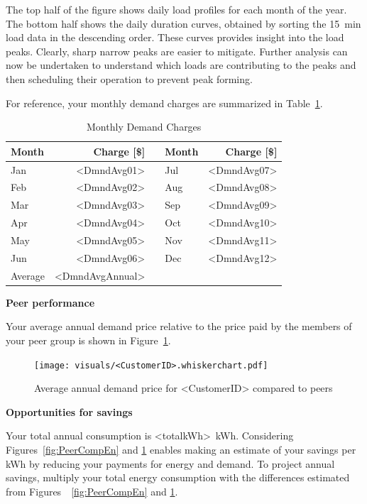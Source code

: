 \documentclass[11pt]{article}
\begin{document}
The top half of the figure shows daily load profiles for each month of the year.
The bottom half shows the daily duration curves, obtained by sorting the 15~min load data in the descending order.
These curves provides insight into  the load peaks.
Clearly, sharp narrow peaks are easier to mitigate.
Further analysis can now be undertaken to understand which loads are contributing to the peaks and then scheduling their operation to prevent peak forming.

\vfill\eject %

For reference, your monthly demand charges are summarized in Table~\ref{tab:demand}.
\begin{table}[th!]
  \centering
  \caption{Monthly Demand Charges}
  \vspace{1.5ex}
  \label{tab:demand}
  \begin{tabular}{p{0.75in}rp{0.2in}p{0.75in}r}
    Month & Charge [\$] & & Month & Charge [\$] \\
    \midrule
    Jan & <DmndAvg01> & & Jul & <DmndAvg07> \\
    Feb & <DmndAvg02> & & Aug & <DmndAvg08> \\
    Mar & <DmndAvg03> & & Sep & <DmndAvg09> \\
    Apr & <DmndAvg04> & & Oct & <DmndAvg10> \\
    May & <DmndAvg05> & & Nov & <DmndAvg11> \\
    Jun & <DmndAvg06> & & Dec & <DmndAvg12> \\
    \midrule
    Average & <DmndAvgAnnual>
  \end{tabular}
\end{table}

\vspace{3ex}
\textbf{\Large Peer performance}
\vspace{1ex}

Your average annual demand price relative to the price paid by the members of your peer group is shown in Figure~\ref{fig:PeerCompDmnd}.

\begin{figure}[!h]
\centering
\texttt{[image: visuals/<CustomerID>.whiskerchart.pdf]}
\caption{Average annual demand price for <CustomerID> compared to peers}
\label{fig:PeerCompDmnd}
\end{figure}

\vspace{3ex}
\textbf{\Large Opportunities for savings}
\vspace{1ex}

Your total annual consumption is <totalkWh>~kWh.
Considering Figures~\ref{fig:PeerCompEn} and \ref{fig:PeerCompDmnd} enables making an estimate of your savings per kWh by reducing your payments for energy and demand.
To project annual savings, multiply your total energy consumption with the differences estimated from Figures~~\ref{fig:PeerCompEn} and \ref{fig:PeerCompDmnd}.
\end{document}
